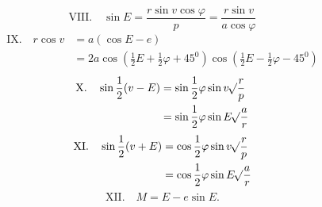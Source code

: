 \[
\mathrm{VIII.}\quad\sin E=\frac{r\sin v\cos\varphi}{p}=\frac{r\sin v}{a\cos\varphi}
\]
\[
\begin{aligned}
\mathrm{IX.}\quad r\cos v&=a(\cos E-e)\\
&=2a\cos(\frac{1}{2}E+\frac{1}{2}\varphi+45^0)\cos(\frac{1}{2}E-\frac{1}{2}\varphi-45^0)
\end{aligned}
\]
\[
\begin{aligned}
\mathrm{X.}\quad\sin\frac{1}{2}(v-E)&=\sin\frac{1}{2}\varphi\sin v\mathord{{}^{}\!\surd}\frac{r}{p}\\
&=\sin\frac{1}{2}\varphi\sin E\mathord{{}^{}\!\surd}\frac{a}{r}
\end{aligned}
\]
\[
\begin{aligned}
\mathrm{XI.}\quad\sin\frac{1}{2}(v+E)&=\cos\frac{1}{2}\varphi\sin v\mathord{{}^{}\!\surd}\frac{r}{p}\\
&=\cos\frac{1}{2}\varphi\sin E\mathord{{}^{}\!\surd}\frac{a}{r}
\end{aligned}
\]
\[
\mathrm{XII.}\quad M=E-e\sin E.
\]

